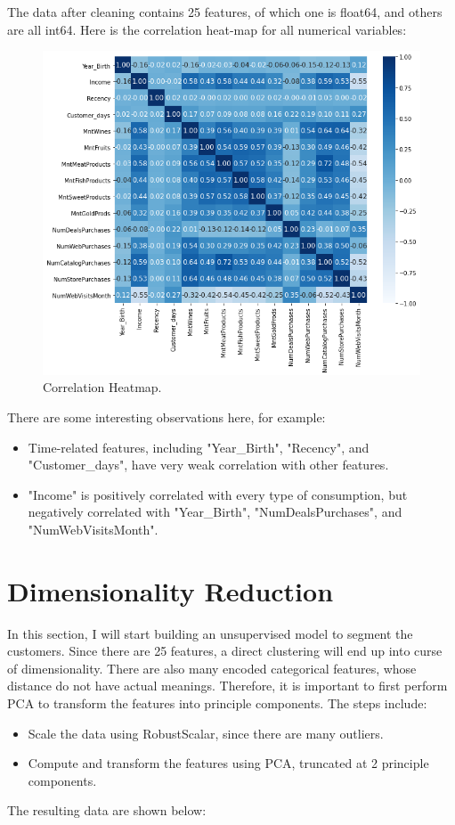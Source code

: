 \documentclass[11pt]{article}
\begin{document}
The data after cleaning contains 25 features, of which one is float64, and others are all int64.
Here is the correlation heat-map for all numerical variables:

\begin{figure}[h!]
\centerline{\includegraphics[scale=0.7]{clu_2.png}}
\caption{Correlation Heatmap.}
\end{figure}

There are some interesting observations here, for example:
\begin{itemize}
\item Time-related features, including "Year\_Birth", "Recency", and "Customer\_days", have very weak correlation with other features.
\item "Income" is positively correlated with every type of consumption, but negatively correlated with "Year\_Birth", "NumDealsPurchases", and "NumWebVisitsMonth".
\end{itemize}

\section{Dimensionality Reduction}\label{section-model}
In this section, I will start building an unsupervised model to segment the customers.
Since there are 25 features, a direct clustering will end up into curse of dimensionality.
There are also many encoded categorical features, whose distance do not have actual meanings.
Therefore, it is important to first perform PCA to transform the features into principle components.
The steps include:
\begin{itemize}
\item Scale the data using RobustScalar, since there are many outliers.
\item Compute and transform the features using PCA, truncated at 2 principle components.
\end{itemize}
The resulting data are shown below:
\end{document}
